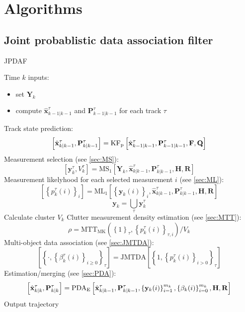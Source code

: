 \section{Algorithms}
\subsection{Joint probablistic data association filter}
\begin{algorithm}
    \label{alg:jpdaf}
    \caption{JPDAF}
    \begin{algorithmic}[1]
        \State Time $k$ inputs:
        \begin{itemize}
            \item set $\mathbf Y_k $
            \item compute $\hat{\mathbf x}^\tau_{k-1|k-1}$ and $\mathbf P^\tau_{k-1|k-1}$ for each track $\tau$
        \end{itemize}
        \State Track state prediction:
        $$\left[ \hat{\mathbf x}^\tau_{k|k-1}, \mathbf P^\tau_{k|k-1}\right] = \text{KF}_\text p \left[ \hat{\mathbf x}^\tau_{k-1|k-1},\mathbf P^\tau_{k-1|k-1}, \mathbf F, \mathbf Q\right]$$
        \State Measurement selection (see \ref{sec:MS}):
        $$\left[\mathbf y^\tau_k, V^\tau_k\right] = \text{MS}_1\left[\mathbf Y_k, \hat{\mathbf x}^\tau_{k|k-1}, \mathbf P^\tau_{k|k-1}, \mathbf H, \mathbf R\right]$$
        \State Measurement likelyhood for each selected measurement $i$ (see \ref{sec:ML}):
        $$\left[\left\{ p^\tau_k(i)\right\}_i\right] = \text{ML}_1\left[\left\{\mathbf y_k(i)\right\}_i, \hat{\mathbf x}^\tau_{k|k-1}, \mathbf P^\tau_{k|k-1}, \mathbf H, \mathbf R\right]$$
        \EndFor
        $$\mathbf y_k = \bigcup_\tau \mathbf y^\tau_k$$
        \State Calculate cluster $V_k$ 
        \State Clutter measurement density estimation (see \ref{sec:MTT}):
        $$\rho = \text{MTT}_\text{MK}\left( \left\{ 1 \right\}_\tau, \left\{ p^\tau_k(i) \right\}_{\tau,i}\right)/V_k$$
        \EndIf
        \State Multi-object data association (see \ref{sec:JMTDA}):
        $$\left[\left\{ \cdot , \left\{\beta_k^\tau(i)\right\}_{i\geq 0}\right\}_\tau\right] = \text{JMTDA}\!\left[\left\{ 1, \left\{ p^\tau_k(i)\right\}_{i>0}\right\}_\tau\right]$$
        \EndFor
        \State Estimation/merging (see \ref{sec:PDA}):
        $$\left[\hat{\mathbf x}^\tau_{k|k}, \mathbf P^\tau_{k|k}\right] = \text{PDA}_\text E \left[\hat{\mathbf x}^\tau_{k|k-1}, \mathbf P^\tau_{k|k-1}, \left\{ \mathbf y_k(i)\right\}^{m_k}_{i=1}, \left\{ \mathbf \beta_k(i)\right\}^{m_k}_{i=0}, \mathbf H, \mathbf R\right]$$
        \State Output trajectory
        \EndFor 
    \end{algorithmic}
\end{algorithm}


